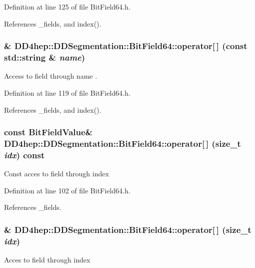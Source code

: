 Definition at line 125 of file BitField64.h.

References \_\-fields, and index().\hypertarget{class_d_d4hep_1_1_d_d_segmentation_1_1_bit_field64_a452aca96e8536e9fc262b7d5255f0e02}{
\subsubsection[{operator[]}]{\& DD4hep::DDSegmentation::BitField64::operator\mbox{[}$\,$\mbox{]} (const std::string \& {\em name})}}
\label{class_d_d4hep_1_1_d_d_segmentation_1_1_bit_field64_a452aca96e8536e9fc262b7d5255f0e02}
Access to field through name . 

Definition at line 119 of file BitField64.h.

References \_\-fields, and index().\hypertarget{class_d_d4hep_1_1_d_d_segmentation_1_1_bit_field64_aac8290154832409c97ccb6dc7c7049e6}{
\subsubsection[{operator[]}]{\setlength{\rightskip}{0pt plus 5cm}const {\bf BitFieldValue}\& DD4hep::DDSegmentation::BitField64::operator\mbox{[}$\,$\mbox{]} (size\_\-t {\em idx}) const}}
\label{class_d_d4hep_1_1_d_d_segmentation_1_1_bit_field64_aac8290154832409c97ccb6dc7c7049e6}
Const acces to field through index 

Definition at line 102 of file BitField64.h.

References \_\-fields.\hypertarget{class_d_d4hep_1_1_d_d_segmentation_1_1_bit_field64_aa04125e96306ce31f9aa042c4123c315}{
\subsubsection[{operator[]}]{\& DD4hep::DDSegmentation::BitField64::operator\mbox{[}$\,$\mbox{]} (size\_\-t {\em idx})}}
\label{class_d_d4hep_1_1_d_d_segmentation_1_1_bit_field64_aa04125e96306ce31f9aa042c4123c315}
Acces to field through index 

